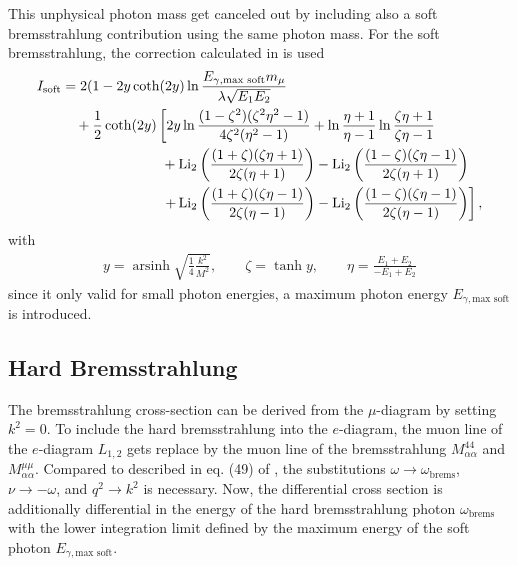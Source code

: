 This unphysical photon mass get canceled out by including also a soft bremsstrahlung contribution using the same photon mass.
For the soft bremsstrahlung, the correction calculated in \cite{Mork65} is used
\begin{equation}
\begin{aligned}
    I_{\text{soft}} &= 2(1 - 2y \coth (2y) \operatorname{ln} \frac{E_{\gamma, \text{max soft}} m_\mu}{\lambda \sqrt{E_1 E_2}}
    \\
    &\quad + \frac12 \coth (2y) \left[
        2y \operatorname{ln} \frac{(1 - \zeta^2)(\zeta^2\eta^2 - 1)}{4 \zeta^2 (\eta^2 - 1)}
        + \operatorname{ln} \frac{\eta + 1}{\eta - 1} \operatorname{ln} \frac{\zeta \eta + 1}{\zeta \eta - 1} \right.
    \\
    &\quad \hphantom{+ \frac12 \coth (2y) +}
        + \operatorname{Li_2} \left( \frac{(1 + \zeta)(\zeta \eta + 1)}{2 \zeta (\eta + 1)} \right)
        - \operatorname{Li_2} \left( \frac{(1 - \zeta)(\zeta \eta - 1)}{2 \zeta (\eta + 1)} \right)
    \\
    &\quad \hphantom{+ \frac12 \coth (2y) +} \left.
        + \operatorname{Li_2} \left( \frac{(1 + \zeta)(\zeta \eta - 1)}{2 \zeta (\eta - 1)} \right)
        - \operatorname{Li_2} \left( \frac{(1 - \zeta)(\zeta \eta - 1)}{2 \zeta (\eta - 1)} \right)
    \right] ,
\end{aligned}
\end{equation}
with
\begin{align}
    y = \operatorname{arsinh} \sqrt{\frac14 \frac{k^2}{M^2}} ,
    \qquad
    \zeta = \tanh y ,
    \qquad
    \eta = \frac{E_1 + E_2}{-E_1 + E_2}
\end{align}
since it only valid for small photon energies, a maximum photon energy $E_{\gamma, \text{max soft}}$ is introduced.

\subsection{Hard Bremsstrahlung}

The bremsstrahlung cross-section can be derived from the $\mu$-diagram by setting $k^2 = 0$.
To include the hard bremsstrahlung into the $e$-diagram, the muon line of the $e$-diagram $L_{1,2}$ gets replace by the muon line of the bremsstrahlung $M_{\alpha \alpha}^{44}$ and $M_{\alpha \alpha}^{\mu \mu}$.
Compared to described in eq. (49) of \cite{Bugaev77}, the substitutions $\omega \to \omega_{\mathrm{brems}}$, $\nu \to -\omega$, and $q^2 \to k^2$ is necessary.
Now, the differential cross section is additionally differential in the energy of the hard bremsstrahlung photon $\omega_{\mathrm{brems}}$ with the lower integration limit defined by the maximum energy of the soft photon $E_{\gamma, \text{max soft}}$.

